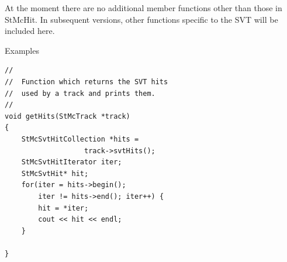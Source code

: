 \begin{Entry}
    At the moment there are no additional member functions other
    than those in StMcHit.  In subsequent versions, other functions
    specific to the SVT will be included here.

\item[Examples]
{\footnotesize
\begin{verbatim}
//
//  Function which returns the SVT hits
//  used by a track and prints them.
//
void getHits(StMcTrack *track)
{
    StMcSvtHitCollection *hits =
                   track->svtHits();
    StMcSvtHitIterator iter;
    StMcSvtHit* hit;
    for(iter = hits->begin();
        iter != hits->end(); iter++) {
        hit = *iter;
        cout << hit << endl;
    }
    
}
\end{verbatim}
}%
\end{Entry}


%
%

